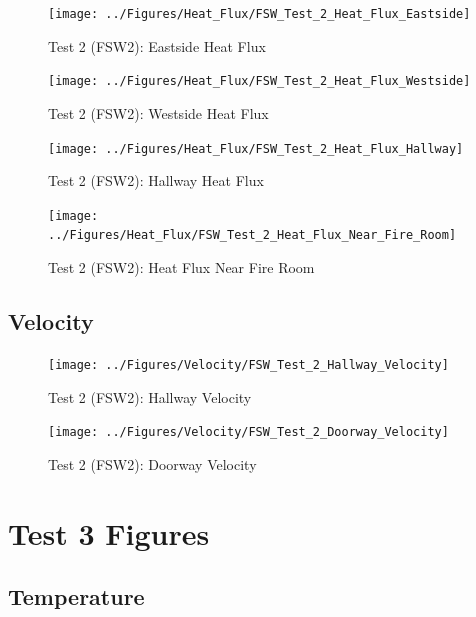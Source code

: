 \documentclass[12pt,oneside]{book}
\begin{document}
\begin{figure}[!ht]
	\texttt{[image: ../Figures/Heat\_Flux/FSW\_Test\_2\_Heat\_Flux\_Eastside]}
	\caption{Test 2 (FSW2): Eastside Heat Flux}
	\label{fig:Test_2_Eastside_Heat_Flux}
\end{figure}

\begin{figure}[!ht]
	\texttt{[image: ../Figures/Heat\_Flux/FSW\_Test\_2\_Heat\_Flux\_Westside]}
	\caption{Test 2 (FSW2): Westside Heat Flux}
	\label{fig:Test_2_Westside_Heat_Flux}
\end{figure}

\begin{figure}[!ht]
	\texttt{[image: ../Figures/Heat\_Flux/FSW\_Test\_2\_Heat\_Flux\_Hallway]}
	\caption{Test 2 (FSW2): Hallway Heat Flux}
	\label{fig:Test_2_Hallway_Heat_Flux}
\end{figure}

\begin{figure}[!ht]
	\texttt{[image: ../Figures/Heat\_Flux/FSW\_Test\_2\_Heat\_Flux\_Near\_Fire\_Room]}
	\caption{Test 2 (FSW2): Heat Flux Near Fire Room}
	\label{fig:Test_2_Heat_Flux_Near_Fire_Room}
\end{figure}

\subsection{Velocity}
\label{subsec:Velocity}

\begin{figure}[!ht]
	\texttt{[image: ../Figures/Velocity/FSW\_Test\_2\_Hallway\_Velocity]}
	\caption{Test 2 (FSW2): Hallway Velocity}
	\label{fig:Test_2_Hallway_Velocity}
\end{figure}

\begin{figure}[!ht]
	\texttt{[image: ../Figures/Velocity/FSW\_Test\_2\_Doorway\_Velocity]}
	\caption{Test 2 (FSW2): Doorway Velocity}
	\label{fig:Test_2_Doorway_Velocity}
\end{figure}

\clearpage

\section{Test 3 Figures}
\label{subsec:Test_3_Figures}

\subsection{Temperature}
\label{subsec:Temperature}
\end{document}
